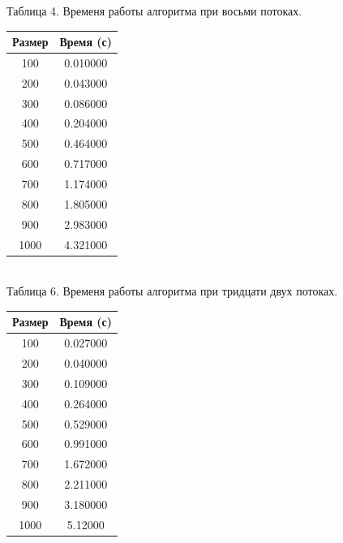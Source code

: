 \documentclass[12pt]{report}
\begin{document}
	\begin{minipage}{0.5\textwidth}
		\begin{center}
			Таблица 4. Временя работы алгоритма при восьми потоках.
			
			\begin{tabular}{|c c|}
				\hline
				Размер & Время (с) \\
				\hline
				100 & 0.010000\\
				\hline
				200 & 0.043000\\
				\hline
				300 & 0.086000\\
				\hline
				400 & 0.204000\\
				\hline
				500 & 0.464000\\
				\hline
				600 & 0.717000\\
				\hline
				700 & 1.174000\\
				\hline
				800 & 1.805000\\
				\hline
				900 & 2.983000\\
				\hline
				1000 & 4.321000\\
				\hline
			\end{tabular}
		
		~\\
		
			Таблица 6. Временя работы алгоритма при тридцати двух потоках.
		
			\begin{tabular}{|c c|}
				\hline
				Размер & Время (с) \\
				\hline
				100 & 0.027000\\
				\hline
				200 & 0.040000\\
				\hline
				300 & 0.109000\\
				\hline
				400 & 0.264000\\
				\hline
				500 & 0.529000\\
				\hline
				600 & 0.991000\\
				\hline
				700 & 1.672000\\
				\hline
				800 & 2.211000\\
				\hline
				900 & 3.180000\\
				\hline
				1000 & 5.12000\\
				\hline
			\end{tabular}
		\end{center}
	\end{minipage}
		
\end{document}
